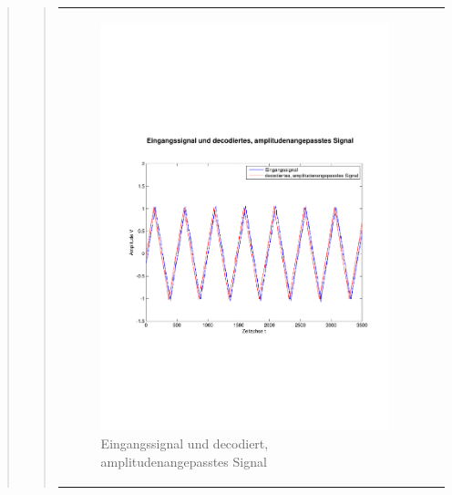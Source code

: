\begin{quote}
\begin{quote}
\begin{center}
\begin{tabular}{ll}
            \hspace{-4cm}
                \begin{minipage}{0.6\textwidth}
                    \begin{figure}[H]
                        \includegraphics[scale=0.4, trim = 0.8cm 7cm 0.8cm
                        8.5cm, clip]
                        {./Bilder/drei100_Eingang_vs_DecodiertAmpl-angepasst}
                          \caption{Eingangssignal und decodiert,
                          amplitudenangepasstes Signal}
                    \end{figure}
                \end{minipage}
                

\end{tabular}
\end{center}
\end{quote}
\end{quote}
